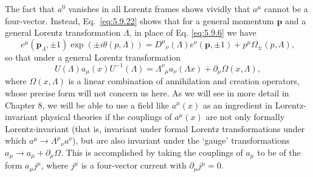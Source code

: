 The fact that $a^0$ vanishes in all Lorentz frames shows vividly that $a^\mu$
cannot be a four-vector. Instead, Eq.~\eqref{eq:5.9.22} shows that for a general momentum
$\mathbf p$ and a general Lorentz transformation $\Lambda$, in place of Eq.
\eqref{eq:5.9.6} we have
\begin{equation}
e^\mu(\mathbf p_\Lambda,\pm1)\exp(\pm i\theta(p,\Lambda))
=D^\mu{}_\nu(\Lambda)e^\nu(\mathbf p,\pm1)
+p^\mu\Omega_\pm(p,\Lambda),
\tag{5.9.30}\label{eq:5.9.30}
\end{equation}
so that under a general Lorentz transformation
\begin{equation}
U(\Lambda)a_\mu(x)U^{-1}(\Lambda)=
\Lambda^\nu{}_\mu a_\nu(\Lambda x)+\partial_\mu\Omega(x,\Lambda),
\tag{5.9.31}\label{eq:5.9.31}
\end{equation}
where $\Omega(x,\Lambda)$ is a linear combination of annihilation and creation
operators, whose precise form will not concern us here. As we will see in more
detail in Chapter 8, we will be able to use a field like $a^\mu(x)$ as an
ingredient in Lorentz-invariant physical theories if the couplings of
$a^\mu(x)$ are not only formally Lorentz-invariant (that is, invariant under
formal Lorentz transformations under which $a^\mu\to\Lambda^\mu{}_\nu
a^\nu$), but are also invariant under the `gauge' transformations
$a_\mu\to a_\mu+\partial_\mu\Omega$. This is accomplished by taking the
couplings of $a_\mu$ to be of the form $a_\mu j^\mu$, where $j^\mu$ is a
four-vector current with $\partial_\mu j^\mu=0$.

